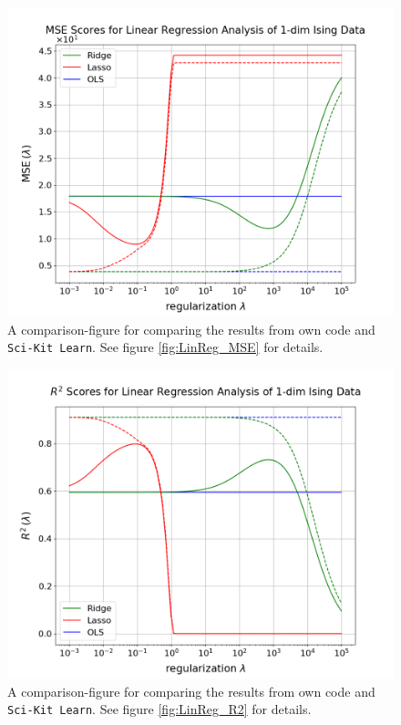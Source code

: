 \documentclass[nofootinbib,reprint,english]{revtex4-1}
\begin{document}
\begin{figure}[h!]
\centering
\includegraphics[scale=0.3]{../output/LinReg/gridsearch_MSE_sklearn.png}
\caption{A comparison-figure for comparing the results from own code and \texttt{Sci-Kit Learn}. See figure \ref{fig:LinReg_MSE} for details.}\label{fig:LinReg_MSE_sklearn}
\end{figure}

\begin{figure}[h!]
\centering
\includegraphics[scale=0.3]{../output/LinReg/gridsearch_R2_sklearn.png}
\caption{A comparison-figure for comparing the results from own code and \texttt{Sci-Kit Learn}. See figure \ref{fig:LinReg_R2} for details.}\label{fig:LinReg_R2_sklearn}
\end{figure}
\end{document}
